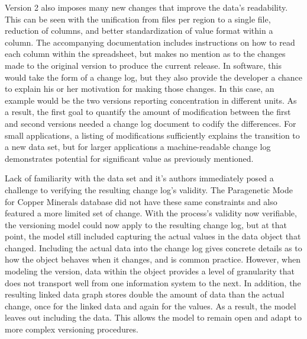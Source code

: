 Version 2 also imposes many new changes that improve the data's readability.
This can be seen with the unification from files per region to a single file, reduction of columns, and better standardization of value format within a column.
The accompanying documentation includes instructions on how to read each column within the spreadsheet, but makes no mention as to the changes made to the original version to produce the current release.
In software, this would take the form of a change log, but they also provide the developer a chance to explain his or her motivation for making those changes.
In this case, an example would be the two versions reporting concentration in different units.
As a result, the first goal to quantify the amount of modification between the first and second versions needed a change log document to codify the differences. For small applications, a listing of modifications sufficiently explains the transition to a new data set, but for larger applications a machine-readable change log demonstrates potential for significant value as previously mentioned.

Lack of familiarity with the data set and it's authors immediately posed a challenge to verifying the resulting change log's validity.
The Paragenetic Mode for Copper Minerals database did not have these same constraints and also featured a more limited set of change.
With the process's validity now verifiable, the versioning model could now apply to the resulting change log, but at that point, the model still included capturing the actual values in the data object that changed.
Including the actual data into the change log gives concrete details as to how the object behaves when it changes, and is common practice.
However, when modeling the version, data within the object provides a level of granularity that does not transport well from one information system to the next.
In addition, the resulting linked data graph stores double the amount of data than the actual change, once for the linked data and again for the values.
As a result, the model leaves out including the data.
This allows the model to remain open and adapt to more complex versioning procedures.

